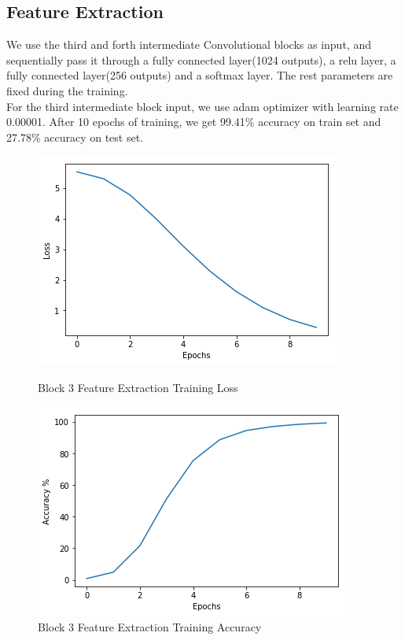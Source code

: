 \documentclass{article}
\begin{document}
\subsection{Feature Extraction}
We use the third and forth intermediate Convolutional blocks as input, and sequentially pass it through a fully connected layer(1024 outputs), a relu layer, a fully connected layer(256 outputs) and a softmax layer. The rest parameters are fixed during the training. \\
For the third intermediate block input, we use adam optimizer with learning rate 0.00001. After 10 epochs of training, we get 99.41\% accuracy on train set and 27.78\% accuracy on test set.\\

\begin{figure}[h!]
	\begin{minipage}{0.48\textwidth}
		\centering
		\includegraphics[width=\textwidth]{pics/fe_block3_loss_10epochs.png}
		\caption{Block 3 Feature Extraction Training Loss}
	\end{minipage}
	\hfill
	\begin{minipage}{0.48\textwidth}
		\centering
		\includegraphics[width=\textwidth]{pics/fe_block3_acc_10epochs.png}
		\caption{Block 3 Feature Extraction Training Accuracy}
	\end{minipage}
\end{figure}
\end{document}
